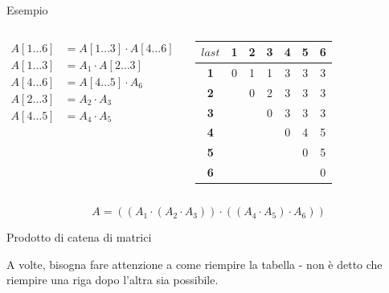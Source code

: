 \begin{frame}{Esempio}

\vspace{-9pt}
\begin{columns}[T]
\begin{align*}
A[1 \ldots 6] &= A[1 \ldots 3] \cdot A[4 \ldots 6] \\
A[1 \ldots 3] &= A_1 \cdot A[2 \ldots 3]\\
A[4 \ldots 6] &= A[4 \ldots 5] \cdot A_6\\
A[2 \ldots 3] &= A_2 \cdot A_3 \\
A[4 \ldots 5] &= A_4 \cdot A_5
\end{align*}

\begin{tabular}{|c|c|c|c|c|c|c|}
\hline
$\mathit{last}$ &  \textbf{1} & \textbf{2} & \textbf{3} & \textbf{4} & \textbf{5} & \textbf{6} \\\hline
\textbf{1} & 0 & 1 & 1 & 3 & 3 & 3 \\\hline
\textbf{2} &   & 0 & 2 & 3 & 3 & 3 \\\hline
\textbf{3} &   &   & 0 & 3 & 3 & 3 \\\hline
\textbf{4} &   &   &   & 0 & 4 & 5 \\\hline
\textbf{5} &   &   &   &   & 0 & 5 \\\hline
\textbf{6} &   &   &   &   &   & 0 \\\hline
\end{tabular}
\end{columns}

\begin{myboxtitle}
\[
 A = ( ( A_1 \cdot  (A_2 \cdot A_3) ) \cdot ( (A_4 \cdot A_5 )  \cdot A_6) )
\]
\end{myboxtitle}

\end{frame}

\begin{frame}{Prodotto di catena di matrici}

\vspace{-9pt}
\begin{myboxtitle}
A volte, bisogna fare attenzione a come riempire la tabella - non è detto che 
riempire una riga dopo l'altra sia possibile.
\end{myboxtitle}

\end{frame}

